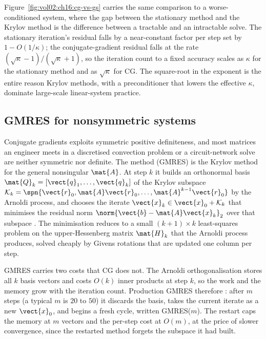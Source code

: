 

Figure~\ref{fig:vol02:ch16:cg-vs-gs} carries the same comparison to a
worse-conditioned system, where the gap between the stationary method and
the Krylov method is the difference between a tractable and an intractable
solve. The stationary iteration's residual falls by a near-constant factor
per step set by $1 - O(1/\kappa)$; the conjugate-gradient residual falls
at the rate $(\sqrt{\kappa} - 1)/(\sqrt{\kappa} + 1)$, so the iteration
count to a fixed accuracy scales as $\kappa$ for the stationary method and
as $\sqrt{\kappa}$ for CG. The square-root in the exponent is the entire
reason Krylov methods, with a preconditioner that lowers the effective
$\kappa$, dominate large-scale linear-system practice.

\subsection{GMRES for nonsymmetric systems}

Conjugate gradients exploits symmetric positive definiteness, and most
matrices an engineer meets in a discretised convection problem or a
circuit-network solve are neither symmetric nor definite. The
 method (GMRES) is the Krylov
method for the general nonsingular $\mat{A}$. At step $k$ it builds an
orthonormal basis $\mat{Q}_{k} = [\vect{q}_{1}, \ldots, \vect{q}_{k}]$ of
the Krylov subspace $\mathcal{K}_{k} = \spn\{\vect{r}_{0},
\mat{A}\vect{r}_{0}, \ldots, \mat{A}^{k-1}\vect{r}_{0}\}$ by the Arnoldi
process, and chooses the iterate $\vect{x}_{k} \in \vect{x}_{0} +
\mathcal{K}_{k}$ that minimises the residual norm $\norm{\vect{b} -
\mat{A}\vect{x}_{k}}_{2}$ over that subspace
\cite[ch.~35]{text:trefethen-bau1997}. The minimisation reduces to a small
$(k+1) \times k$ least-squares problem on the upper-Hessenberg matrix
$\mat{H}_{k}$ that the Arnoldi process produces, solved cheaply by Givens
rotations that are updated one column per step.

GMRES carries two costs that CG does not. The Arnoldi orthogonalisation
stores all $k$ basis vectors and costs $O(k)$ inner products at step $k$,
so the work and the memory grow with the iteration count. Production GMRES
therefore : after $m$ steps (a typical $m$ is $20$ to
$50$) it discards the basis, takes the current iterate as a new $\vect{x}_{0}$,
and begins a fresh cycle, written GMRES($m$). The restart caps the memory
at $m$ vectors and the per-step cost at $O(m)$, at the price of slower
convergence, since the restarted method forgets the subspace it had built.

